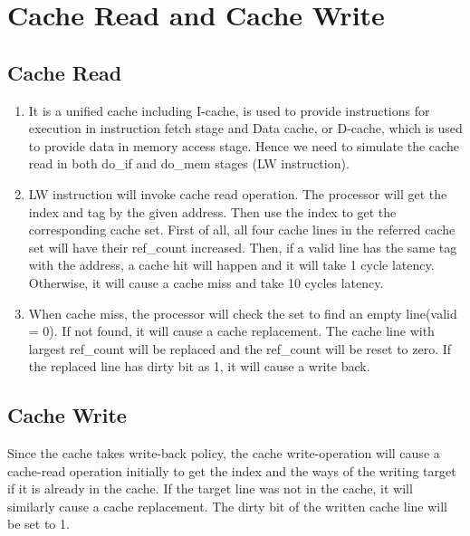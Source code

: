 \documentclass[paper=a4, fontsize=11pt]{scrartcl} %
\numberwithin{equation}{section} %
\numberwithin{figure}{section} %
\numberwithin{table}{section} %
\begin{document}
\section{Cache Read and Cache Write}



\subsection{Cache Read}

\begin{enumerate}
\item It is a unified cache including I-cache, is used to provide instructions for execution in instruction fetch stage and Data cache, or D-cache, which is used to provide data in memory access stage. Hence we need to simulate the cache read in both do\_if and do\_mem stages (LW instruction).
\item LW instruction will invoke cache read operation. The processor will get the index and tag by the given address. Then use the index to get the corresponding cache set. First of all, all four cache lines in the referred cache set will have their ref\_count increased. Then, if a valid line has the same tag with the address, a cache hit will happen and it will take 1 cycle latency. Otherwise, it will cause a cache miss and take 10 cycles latency.
\item When cache miss, the processor will check the set to find an empty line(valid = 0). If not found, it will cause a cache replacement. The cache line with largest ref\_count will be replaced and the ref\_count will be reset to zero. If the replaced line has dirty bit as 1, it will cause a write back.
\end{enumerate}

\subsection{Cache Write}
Since the cache takes write-back policy, the cache write-operation will cause a cache-read operation initially to get the index and the ways of the writing target if it is already in the cache. If the target line was not in the cache, it will similarly cause a cache replacement. The dirty bit of the written cache line will be set to 1.
\end{document}
